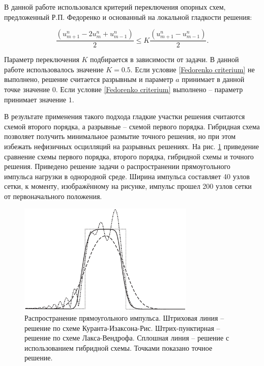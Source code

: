 В данной работе использовался критерий переключения опорных схем, предложенный Р.П. Федоренко и основанный на локальной гладкости решения:

\begin{equation}
	\label{Fedorenko criterium}
	\frac{(u^n_{m+1} - 2u^n_m + u^n_{m-1})}{2} \le K \frac{(u^n_{m+1} - u^n_{m-1})}{2} .
\end{equation}

Параметр переключения $K$ подбирается в зависимости от задачи. В данной работе использовалось значение $K = 0.5$. Если условие \eqref{Fedorenko criterium} не выполнено, решение считается разрывным и параметр $a$ принимает в данной точке значение $0$. Если условие \eqref{Fedorenko criterium} выполнено -- параметр принимает значение $1$.

В результате применения такого подхода гладкие участки решения считаются схемой второго порядка, а разрывные -- схемой первого порядка. Гибридная схема позволяет получить минимальное размытие точного решения, но при этом избежать нефизичных осцилляций на разрывных решениях. На рис. \ref{pic:hybrid-scheme-testing} приведение сравнение схемы первого порядка, второго порядка, гибридной схемы и точного решения. Приведено решение задачи о распространении прямоугольного импульса нагрузки в однородной среде. Ширина импульса составляет 40 узлов сетки, к моменту, изображённому на рисунке, импульс прошел 200 узлов сетки от первоначального положения.

\begin{figure}[h]
\centerline{\includegraphics[width=0.75\textwidth]{png/hybrid-scheme-testing.png}}
\caption{Распространение прямоугольного импульса. Штриховая линия -- решение по схеме Куранта-Изаксона-Рис. Штрих-пунктирная -- решение по схеме Лакса-Вендрофа. Сплошная линия -- решение с использованием гибридной схемы. Точками показано точное решение.}
\label{pic:hybrid-scheme-testing}
\end{figure}

